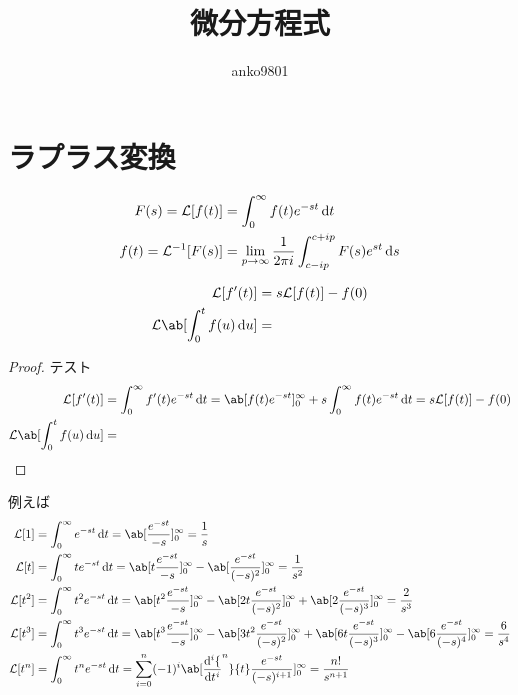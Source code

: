 \documentclass[uplatex,diffipdfmx,a4paper,11pt]{jlreq}
\title{微分方程式}
\author{anko9801}
\newcommand{\LL}{\mathcal{L}}
\begin{document}
\maketitle
\tableofcontents
\clearpage


\section{ラプラス変換}
\begin{definition}[ラプラス変換]
  \begin{align}
    F(s) = \LL[f(t)]      & = \int_0^\infty f(t)e^{-st}\dl{t}                                     \\
    f(t) = \LL^{-1}[F(s)] & = \lim_{p\to\infty}\frac{1}{2\pi i}\int_{c-ip}^{c+ip}F(s)e^{st}\dl{s}
  \end{align}
\end{definition}
\begin{theorem}
  \begin{align}
    \LL[f'(t)]                 & = s\LL[f(t)] - f(0) \\
    \LL\ab[\int_0^tf(u)\dl{u}] & =
  \end{align}
\end{theorem}
\begin{proof}
  テスト
  \begin{align}
    \LL[f'(t)]                 & = \int_0^\infty f'(t)e^{-st}\dl{t} = \ab[f(t)e^{-st}]_0^\infty + s\int_0^\infty f(t)e^{-st}\dl{t} = s\LL[f(t)] - f(0) \\
    \LL\ab[\int_0^tf(u)\dl{u}] & =
  \end{align}
\end{proof}
例えば
\begin{align}
  \LL[1]   & = \int_0^\infty e^{-st}\dl{t} = \ab[\frac{e^{-st}}{-s}]_0^\infty = \frac{1}{s}                                                                                                                                     \\
  \LL[t]   & = \int_0^\infty te^{-st}\dl{t} = \ab[t\frac{e^{-st}}{-s}]_0^\infty - \ab[\frac{e^{-st}}{(-s)^2}]_0^\infty = \frac{1}{s^2}                                                                                          \\
  \LL[t^2] & = \int_0^\infty t^2e^{-st}\dl{t} = \ab[t^2\frac{e^{-st}}{-s}]_0^\infty - \ab[2t\frac{e^{-st}}{(-s)^2}]_0^\infty + \ab[2\frac{e^{-st}}{(-s)^3}]_0^\infty = \frac{2}{s^3}                                            \\
  \LL[t^3] & = \int_0^\infty t^3e^{-st}\dl{t} = \ab[t^3\frac{e^{-st}}{-s}]_0^\infty - \ab[3t^2\frac{e^{-st}}{(-s)^2}]_0^\infty + \ab[6t\frac{e^{-st}}{(-s)^3}]_0^\infty - \ab[6\frac{e^{-st}}{(-s)^4}]_0^\infty = \frac{6}{s^4} \\
  \LL[t^n] & = \int_0^\infty t^ne^{-st}\dl{t} = \sum_{i = 0}^{n}(-1)^i\ab[\diff[i]{t^n}{t}\frac{e^{-st}}{(-s)^{i+1}}]_0^\infty = \frac{n!}{s^{n+1}}
\end{align}
\end{document}
